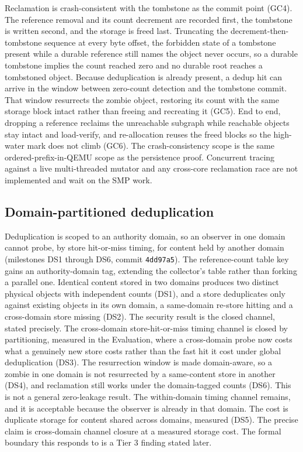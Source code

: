\documentclass[10pt,twocolumn]{article}
\begin{document}
Reclamation is crash-consistent with the tombstone as the commit point (GC4). The
reference removal and its count decrement are recorded first, the tombstone is
written second, and the storage is freed last. Truncating the
decrement-then-tombstone sequence at every byte offset, the forbidden state of a
tombstone present while a durable reference still names the object never occurs,
so a durable tombstone implies the count reached zero and no durable root reaches
a tombstoned object. Because deduplication is already present, a dedup hit can
arrive in the window between zero-count detection and the tombstone commit. That
window resurrects the zombie object, restoring its count with the same storage
block intact rather than freeing and recreating it (GC5). End to end, dropping a
reference reclaims the unreachable subgraph while reachable objects stay intact
and load-verify, and re-allocation reuses the freed blocks so the high-water mark
does not climb (GC6). The crash-consistency scope is the same
ordered-prefix-in-QEMU scope as the persistence proof. Concurrent tracing against
a live multi-threaded mutator and any cross-core reclamation race are not
implemented and wait on the SMP work.

\subsection{Domain-partitioned deduplication}

Deduplication is scoped to an authority domain, so an observer in one domain
cannot probe, by store hit-or-miss timing, for content held by another domain
(milestones DS1 through DS6, commit \texttt{4dd97a5}). The reference-count table
key gains an authority-domain tag, extending the collector's table rather than
forking a parallel one. Identical content stored in two domains produces two
distinct physical objects with independent counts (DS1), and a store deduplicates
only against existing objects in its own domain, a same-domain re-store hitting
and a cross-domain store missing (DS2). The security result is the closed channel,
stated precisely. The cross-domain store-hit-or-miss timing channel is closed by
partitioning, measured in the Evaluation, where a cross-domain probe now costs
what a genuinely new store costs rather than the fast hit it cost under global
deduplication (DS3). The resurrection window is made domain-aware, so a zombie in
one domain is not resurrected by a same-content store in another (DS4), and
reclamation still works under the domain-tagged counts (DS6). This is not a
general zero-leakage result. The within-domain timing channel remains, and it is
acceptable because the observer is already in that domain. The cost is duplicate
storage for content shared across domains, measured (DS5). The precise claim is
cross-domain channel closure at a measured storage cost. The formal boundary this
responds to is a Tier 3 finding stated later.
\end{document}
